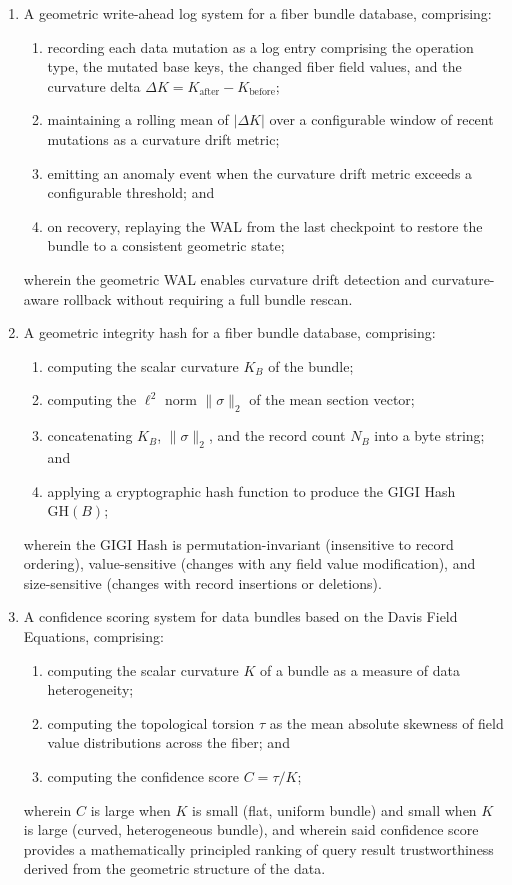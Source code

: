 \documentclass[11pt,letterpaper]{article}
\begin{document}
\begin{enumerate}
\item A geometric write-ahead log system for a fiber bundle database, comprising:
\begin{enumerate}[label=(\alph*)]
  \item recording each data mutation as a log entry comprising the operation type, the mutated base keys, the changed fiber field values, and the curvature delta $\Delta K = K_{\mathrm{after}} - K_{\mathrm{before}}$;
  \item maintaining a rolling mean of $|\Delta K|$ over a configurable window of recent mutations as a curvature drift metric;
  \item emitting an anomaly event when the curvature drift metric exceeds a configurable threshold; and
  \item on recovery, replaying the WAL from the last checkpoint to restore the bundle to a consistent geometric state;
\end{enumerate}
wherein the geometric WAL enables curvature drift detection and curvature-aware rollback without requiring a full bundle rescan.

\item A geometric integrity hash for a fiber bundle database, comprising:
\begin{enumerate}[label=(\alph*)]
  \item computing the scalar curvature $K_B$ of the bundle;
  \item computing the $\ell^2$ norm $\|\sigma\|_2$ of the mean section vector;
  \item concatenating $K_B$, $\|\sigma\|_2$, and the record count $N_B$ into a byte string; and
  \item applying a cryptographic hash function to produce the GIGI Hash $\mathrm{GH}(B)$;
\end{enumerate}
wherein the GIGI Hash is permutation-invariant (insensitive to record ordering), value-sensitive (changes with any field value modification), and size-sensitive (changes with record insertions or deletions).

\item A confidence scoring system for data bundles based on the Davis Field Equations, comprising:
\begin{enumerate}[label=(\alph*)]
  \item computing the scalar curvature $K$ of a bundle as a measure of data heterogeneity;
  \item computing the topological torsion $\tau$ as the mean absolute skewness of field value distributions across the fiber; and
  \item computing the confidence score $C = \tau / K$;
\end{enumerate}
wherein $C$ is large when $K$ is small (flat, uniform bundle) and small when $K$ is large (curved, heterogeneous bundle), and wherein said confidence score provides a mathematically principled ranking of query result trustworthiness derived from the geometric structure of the data.


\end{enumerate}
\end{document}
